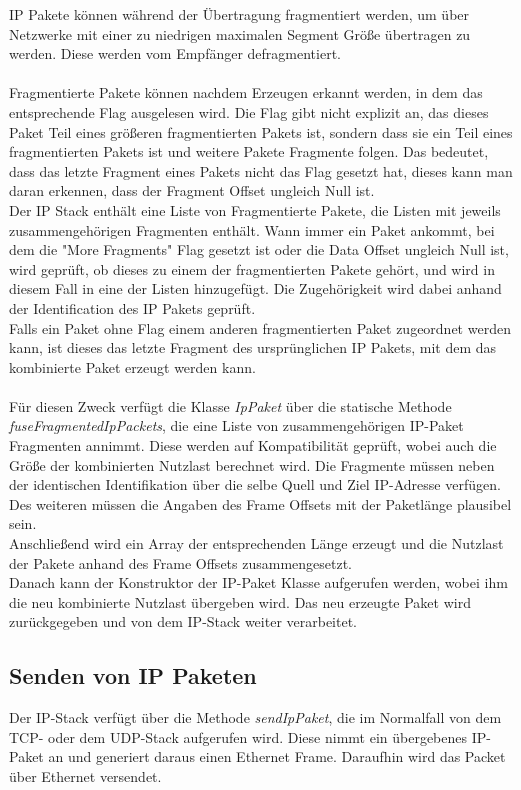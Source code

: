 IP Pakete können während der Übertragung fragmentiert werden, um über Netzwerke mit einer zu niedrigen maximalen Segment Größe übertragen zu werden. Diese werden vom Empfänger defragmentiert. \\\\
Fragmentierte Pakete können nachdem Erzeugen erkannt werden, in dem das entsprechende Flag ausgelesen wird. Die Flag gibt nicht explizit an, das dieses Paket Teil eines größeren fragmentierten Pakets ist, sondern dass sie ein Teil eines fragmentierten Pakets ist und weitere Pakete Fragmente folgen. Das bedeutet, dass das letzte Fragment eines Pakets nicht das Flag gesetzt hat, dieses kann man daran erkennen, dass der Fragment Offset ungleich Null ist.\\
Der IP Stack enthält eine Liste von Fragmentierte Pakete, die Listen mit jeweils zusammengehörigen Fragmenten enthält. Wann immer ein Paket ankommt, bei dem die {}"More Fragments"{} Flag gesetzt ist oder die Data Offset ungleich Null ist, wird geprüft, ob dieses zu einem der fragmentierten Pakete gehört, und wird in diesem Fall in eine der Listen hinzugefügt. Die Zugehörigkeit wird dabei anhand der Identification des IP Pakets geprüft. \\
Falls ein Paket ohne Flag einem anderen fragmentierten Paket zugeordnet werden kann, ist dieses das letzte Fragment des ursprünglichen IP Pakets, mit dem das kombinierte Paket erzeugt werden kann. \\\\
Für diesen Zweck verfügt die Klasse \textit{IpPaket} über die statische Methode \textit{fuseFragmentedIpPackets}, die eine Liste von zusammengehörigen IP-Paket Fragmenten annimmt. Diese werden auf Kompatibilität geprüft, wobei auch die Größe der kombinierten Nutzlast berechnet wird. Die Fragmente müssen neben der identischen Identifikation über die selbe Quell und Ziel IP-Adresse verfügen. Des weiteren müssen die Angaben des Frame Offsets mit der Paketlänge plausibel sein. \\
Anschließend wird ein Array der entsprechenden Länge erzeugt und die Nutzlast der Pakete anhand des Frame Offsets zusammengesetzt. \\Danach kann der Konstruktor der IP-Paket Klasse aufgerufen werden, wobei ihm die neu kombinierte Nutzlast übergeben wird. Das neu erzeugte Paket wird zurückgegeben und von dem IP-Stack weiter verarbeitet. 


\subsection{Senden von IP Paketen}
Der IP-Stack verfügt über die Methode \textit{sendIpPaket}, die im Normalfall von dem TCP- oder dem UDP-Stack aufgerufen wird. Diese nimmt ein übergebenes IP-Paket an und generiert daraus einen Ethernet Frame. Daraufhin wird das Packet über Ethernet versendet. 


